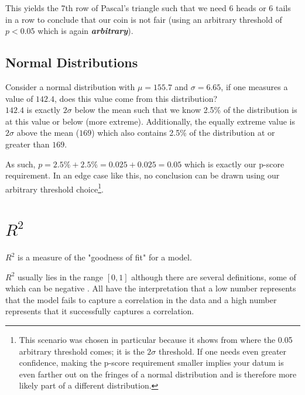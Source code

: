 \documentclass[]{article}
\begin{document}
This yields the 7th row of Pascal's triangle such that we need 6 heads or 6 tails in a row to conclude that our coin is not fair (using an arbitrary threshold of $p < 0.05$ which is again \textbf{\textit{arbitrary}}).

\subsection{Normal Distributions}
Consider a normal distribution with $\mu = 155.7$ and $\sigma = 6.65$, if one measures a value of $142.4$, does this value come from this distribution?\\

$142.4$ is exactly $2\sigma$ below the mean such that we know 2.5\% of the distribution is at this value or below (more extreme). Additionally, the equally extreme value is $2\sigma$ above the mean ($169$) which also contains 2.5\% of the distribution at or greater than $169$. 

As such, $p = 2.5\% + 2.5\% = 0.025 + 0.025 = 0.05$ which is exactly our p-score requirement. In an edge case like this, no conclusion can be drawn using our arbitrary threshold choice\footnote{This scenario was chosen in particular because it shows from where the 0.05 arbitrary threshold comes; it is the $2\sigma$ threshold. If one needs even greater confidence, making the p-score requirement smaller implies your datum is even farther out on the fringes of a normal distribution and is therefore more likely part of a different distribution.}.

\section{$R^2$}
\label{section_R-sq}
$R^2$ is a measure of the "goodness of fit" for a model.

$R^2$ usually lies in the range $[0, 1]$ although there are several definitions, some of which can be negative \cite{r2}. All have the interpretation that a low number represents that the model fails to capture a correlation in the data and a high number represents that it successfully captures a correlation.\\
\end{document}
